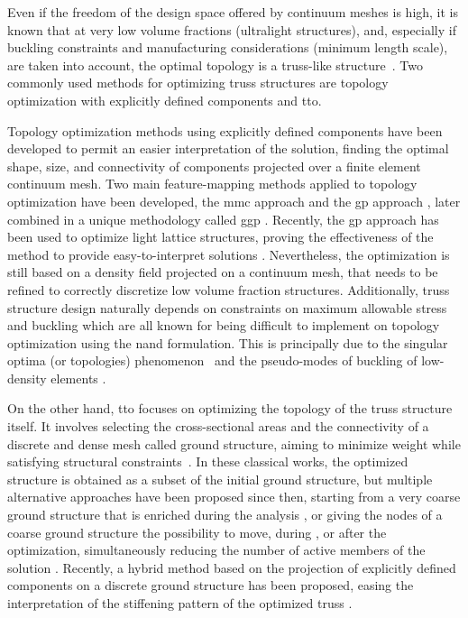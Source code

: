 Even if the freedom of the design space offered by continuum meshes is high, it is known that at very low volume fractions (\eg ultralight structures), and, especially if buckling constraints and manufacturing considerations (\eg minimum length scale), are taken into account, the optimal topology is a truss-like structure~\cite{sigmund_non-optimality_2016}. Two commonly used methods for optimizing truss structures are topology optimization with explicitly defined components and \gls{tto}. 

Topology optimization methods using explicitly defined components have been developed to permit an easier interpretation of the solution, finding the optimal shape, size, and connectivity of components projected over a finite element continuum mesh. Two main feature-mapping methods applied to topology optimization have been developed\cite{wein_review_2020}, the \gls{mmc} approach \cite{guo_doing_2014,zhang_new_2017}
and the \gls{gp} approach \cite{norato_geometry_2015, zhang_geometry_2016}, later combined in a unique methodology called \gls{ggp} \cite{coniglio_generalized_2020}. Recently, the \gls{gp} approach has been used to optimize light lattice structures, proving the effectiveness of the method to provide easy-to-interpret solutions \cite{kazemi_multi-material_2020}. Nevertheless, the optimization is still based on a density field projected on a continuum mesh, that needs to be refined to correctly discretize low volume fraction structures. Additionally, truss structure design naturally depends on constraints on maximum allowable stress and buckling which are all known for being difficult to implement on topology optimization using the \gls{nand} formulation. This is principally due to the singular optima (or topologies) phenomenon~\cite{cheng_-relaxed_1997,rozvany_design-dependent_2001} and the pseudo-modes of buckling of low-density elements \cite{gao_topology_2015}.

On the other hand, \gls{tto} focuses on optimizing the topology of the truss structure itself. It involves selecting the cross-sectional areas and the connectivity of a discrete and dense mesh called ground structure, aiming to minimize weight while satisfying structural constraints~\cite{dorn_automatic_1964, fleron1964minimum}. In these classical works, the optimized structure is obtained as a subset of the initial ground structure, but multiple alternative approaches have been proposed since then, \eg starting from a very coarse ground structure that is enriched during the analysis \cite{gilbert_layout_2003}, or giving the nodes of a coarse ground structure the possibility to move, during \cite{pedersen_optimal_1973, achtziger_simultaneous_2007, descamps_lower-bound_2013}, or after the optimization, simultaneously reducing the number of active members of the solution \cite{he_rationalization_2015, lu_reducing_2023}. Recently, a hybrid method based on the projection of explicitly defined components on a discrete ground structure has been proposed, easing the interpretation of the stiffening pattern of the optimized truss \cite{savine_component-based_2021}.


